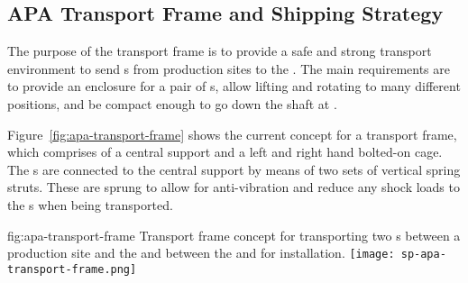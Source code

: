 


\subsection{APA Transport Frame and Shipping Strategy}
\label{sec:fdsp-apa-transport-container}



The purpose of the  transport frame is to provide a safe and strong transport environment to send s  from production sites to the . The main requirements are to provide an enclosure for a pair of s, allow lifting and rotating to many different positions, and be compact enough to go down the shaft at \surf. 

Figure~\ref{fig:apa-transport-frame} shows the current concept for a transport frame, which comprises of a central support and a left and right hand bolted-on cage.  The s are connected to the central support by means of two sets of vertical spring struts. These are sprung to allow for anti-vibration and reduce any shock loads to the s when being transported. 

\begin{dunefigure}{fig:apa-transport-frame}
{Transport frame concept for transporting two s between a production site and the  and between the  and \surf for installation.}  
\texttt{[image: sp-apa-transport-frame.png]} 
\end{dunefigure}

